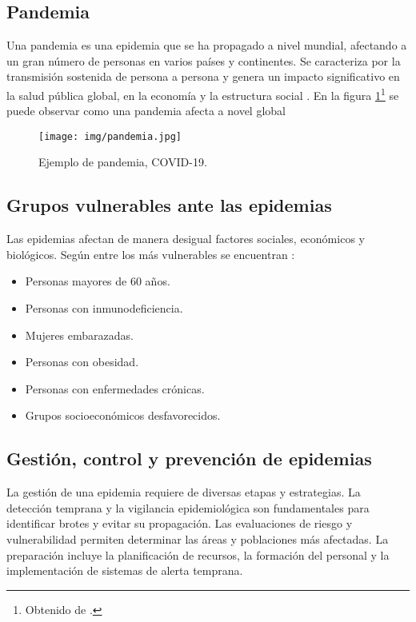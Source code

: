 \subsection{Pandemia}
Una pandemia es una epidemia que se ha propagado a nivel mundial, afectando a un gran número de personas en varios países y continentes. Se caracteriza por la transmisión sostenida de persona a persona y genera un impacto significativo en la salud pública global, en la economía y la estructura social \cite{dias2024towards}. En la figura \ref{fig:pandemia}\footnote{Obtenido de \cite{isglobal_coronavirus_orden}.} se puede observar como una pandemia afecta a novel global

\begin{figure}[H]
    \centering
    \texttt{[image: img/pandemia.jpg]}
    \caption{Ejemplo de pandemia, COVID-19.}
    \label{fig:pandemia}
    \vspace{0.5cm} %
\end{figure}

\subsection{Grupos vulnerables ante las epidemias}
Las epidemias afectan de manera desigual factores sociales, económicos y biológicos. Según \cite{nasution2021poblaciones} entre los más vulnerables se encuentran :
\begin{itemize}
  \item Personas mayores de 60 años.
  \item Personas con inmunodeficiencia.
  \item Mujeres embarazadas.
   \item Personas con obesidad.
   \item Personas con enfermedades crónicas.
   \item Grupos socioeconómicos desfavorecidos. 
\end{itemize}

\subsection{Gestión, control y prevención de epidemias}
La gestión de una epidemia requiere de diversas etapas y estrategias. La detección temprana y la vigilancia epidemiológica son fundamentales para identificar brotes y evitar su propagación. Las evaluaciones de riesgo y vulnerabilidad permiten determinar las áreas y poblaciones más afectadas. La preparación incluye la planificación de recursos, la formación del personal y la implementación de sistemas de alerta temprana.

